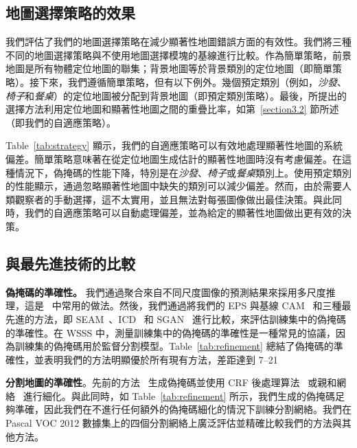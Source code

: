 \documentclass[final]{cvpr}
\begin{document}
\subsection{地圖選擇策略的效果}
我們評估了我們的地圖選擇策略在減少顯著性地圖錯誤方面的有效性。我們將三種不同的地圖選擇策略與不使用地圖選擇模塊的基線進行比較。作為簡單策略，前景地圖是所有物體定位地圖的聯集；背景地圖等於背景類別的定位地圖（即簡單策略）。接下來，我們遵循簡單策略，但有以下例外。幾個預定類別（例如，\emph{沙發}、\emph{椅子}和\emph{餐桌}）的定位地圖被分配到背景地圖（即預定類別策略）。最後，所提出的選擇方法利用定位地圖和顯著性地圖之間的重疊比率，如第~\ref{section3.2} 節所述（即我們的自適應策略）。




Table~\ref{tab:strategy} 顯示，我們的自適應策略可以有效地處理顯著性地圖的系統偏差。簡單策略意味著在從定位地圖生成估計的顯著性地圖時沒有考慮偏差。在這種情況下，偽掩碼的性能下降，特別是在\emph{沙發}、\emph{椅子}或\emph{餐桌}類別上。使用預定類別的性能顯示，通過忽略顯著性地圖中缺失的類別可以減少偏差。然而，由於需要人類觀察者的手動選擇，這不太實用，並且無法對每張圖像做出最佳決策。與此同時，我們的自適應策略可以自動處理偏差，並為給定的顯著性地圖做出更有效的決策。

\subsection{與最先進技術的比較}
\label{section5.3}

\noindent \textbf{偽掩碼的準確性。} 我們通過聚合來自不同尺度圖像的預測結果來採用多尺度推理，這是~\cite{ahn2018learning,wang2020self} 中常用的做法。然後，我們通過將我們的 EPS 與基線 CAM~\cite{zhou2016learning} 和三種最先進的方法，即 SEAM~\cite{wang2020self}、ICD~\cite{fan2020learning} 和 SGAN~\cite{yao2020saliency} 進行比較，來評估訓練集中的偽掩碼的準確性。在 WSSS 中，測量訓練集中的偽掩碼的準確性是一種常見的協議，因為訓練集的偽掩碼用於監督分割模型。Table~\ref{tab:refinement} 總結了偽掩碼的準確性，並表明我們的方法明顯優於所有現有方法，差距達到 7--21%





\vspace{1mm}
\noindent \textbf{分割地圖的準確性}。先前的方法~\cite{ahn2018learning, fan2020learning, wang2020self} 生成偽掩碼並使用 CRF 後處理算法~\cite{krahenbuhl2011efficient} 或親和網絡~\cite{ahn2018learning} 進行細化。與此同時，如 Table~\ref{tab:refinement} 所示，我們生成的偽掩碼足夠準確，因此我們在不進行任何額外的偽掩碼細化的情況下訓練分割網絡。我們在 Pascal VOC 2012 數據集上的四個分割網絡上廣泛評估並精確比較我們的方法與其他方法。
\end{document}
